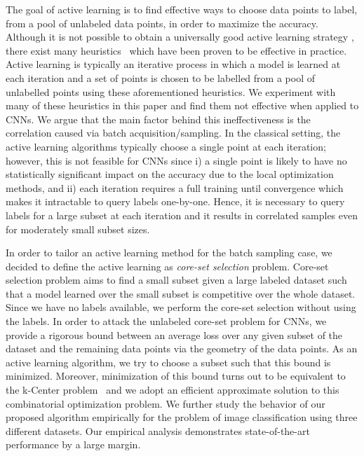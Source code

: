 \documentclass{article} \usepackage{iclr2018_conference,times}
\begin{document}
The goal of active learning is to find effective ways to choose data points to label, from a pool of unlabeled data points, in order to maximize the
accuracy. Although it is not possible to obtain a universally good active learning strategy \citep{dasgupta2004analysis}, there exist many
heuristics~\citep{settles2010active} which have been proven to be effective in practice. Active learning is typically an iterative process in which a
model is learned at each iteration and a set of points is chosen to be labelled from a pool of unlabelled points using these aforementioned heuristics. We experiment
with many of these heuristics in this paper and find them not effective when applied to CNNs. We argue that
the main factor behind this ineffectiveness is the correlation caused via batch acquisition/sampling. In the classical setting, the active learning algorithms
typically choose a single point at each iteration; however, this is not feasible for CNNs since i) a single point is likely to have no statistically
significant impact on the accuracy due to the local optimization methods, and ii) each iteration requires a full training until convergence which
makes it intractable to query labels one-by-one. Hence, it is necessary to query labels for a large subset at each iteration and it results in correlated samples even for
moderately small subset sizes.

In order to tailor an active learning method for the batch sampling case, we decided to define the active learning as \emph{core-set selection} problem. Core-set selection problem aims to find a small subset given a large labeled dataset such that a model learned over the small subset is competitive over the whole dataset. Since
we have no labels available, we perform the core-set selection without using
the labels. In order to attack the unlabeled core-set problem for CNNs, we provide a rigorous bound between an average loss over any given subset of the dataset and
the remaining data points via the geometry of the data points. As an active learning algorithm, we try to choose a subset such that this bound is minimized. Moreover, minimization of this bound turns out to be equivalent to the k-Center problem~\citep{facility} and we adopt an efficient approximate solution to this 
combinatorial optimization problem. We further study the behavior of our proposed algorithm empirically for the problem of image classification using three different datasets. Our empirical analysis demonstrates state-of-the-art performance by a large margin. 
\end{document}
